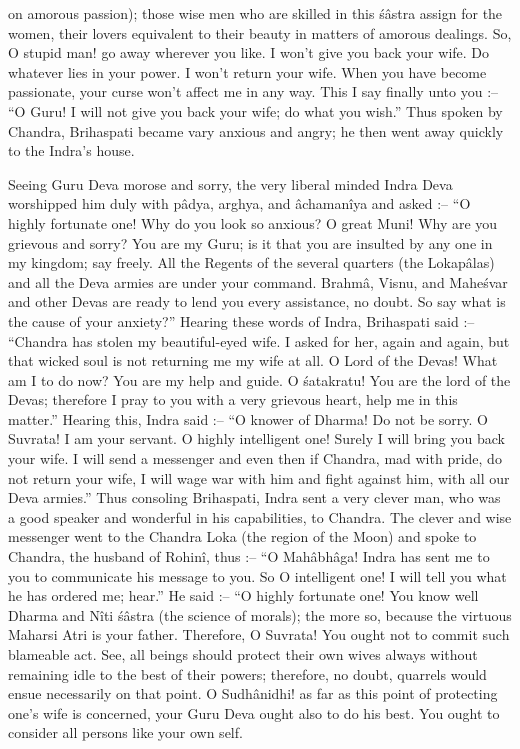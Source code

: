 on amorous passion); those wise men who are skilled in this \'s\^astra assign for the women, their lovers equivalent to their beauty in matters of amorous dealings. So, O stupid man! go away wherever you like. I won't give you back your wife. Do whatever lies in your power. I won't return your wife. When you have become passionate, your curse won't affect me in any way. This I say finally unto you :-- ``O Guru! I will not give you back your wife; do what you wish.'' Thus spoken by Chandra, Brihaspati became vary anxious and angry; he then went away quickly to the Indra's house.

Seeing Guru Deva morose and sorry, the very liberal minded Indra Deva worshipped him duly with p\^adya, arghya, and \^achaman\^iya and asked :-- ``O highly fortunate one! Why do you look so anxious? O great Muni! Why are you grievous and sorry? You are my Guru; is it that you are insulted by any one in my kingdom; say freely. All the Regents of the several quarters (the Lokap\^alas) and all the Deva armies are under your command. Brahm\^a, Visnu, and Mahe\'svar and other Devas are ready to lend you every assistance, no doubt. So say what is the cause of your anxiety?'' Hearing these words of Indra, Brihaspati said :-- ``Chandra has stolen my beautiful-eyed wife. I asked for her, again and again, but that wicked soul is not returning me my wife at all. O Lord of the Devas! What am I to do now? You are my help and guide. O \'satakratu! You are the lord of the Devas; therefore I pray to you with a very grievous heart, help me in this matter.'' Hearing this, Indra said :-- ``O knower of Dharma! Do not be sorry. O Suvrata! I am your servant. O highly intelligent one! Surely I will bring you back your wife. I will send a messenger and even then if Chandra, mad with pride, do not return your wife, I will wage war with him and fight against him, with all our Deva armies.'' Thus consoling Brihaspati, Indra sent a very clever man, who was a good speaker and wonderful in his capabilities, to Chandra. The clever and wise messenger went to the Chandra Loka (the region of the Moon) and spoke to Chandra, the husband of Rohin\^i, thus :-- ``O Mah\^abh\^aga! Indra has sent me to you to communicate his message to you. So O intelligent one! I will tell you what he has ordered me; hear.'' He said :-- ``O highly fortunate one! You know well Dharma and N\^iti \'s\^astra (the science of morals); the more so, because the virtuous Maharsi Atri is your father. Therefore, O Suvrata! You ought not to commit such blameable act. See, all beings should protect their own wives always without remaining idle to the best of their powers; therefore, no doubt, quarrels would ensue necessarily on that point. O Sudh\^anidhi! as far as this point of protecting one's wife is concerned, your Guru Deva ought also to do his best. You ought to consider all persons like your own self.

